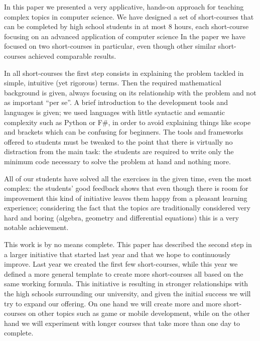 
In this paper we presented a very applicative, hands-on approach for teaching complex topics in computer science. We have designed a set of short-courses that can be completed by high school students in at most 8 hours, each short-course focusing on an advanced application of computer science In the paper we have focused on two short-courses in particular, even though other similar short-courses achieved comparable results.

In all short-courses the first step consists in explaining the problem tackled in simple, intuitive (yet rigorous) terms. Then the required mathematical background is given, always focusing on its relationship with the problem and not as important ``per se''. A brief introduction to the development tools and languages is given; we used languages with little syntactic and semantic complexity such as Python or F\#, in order to avoid explaining things like scope and brackets which can be confusing for beginners. The tools and frameworks offered to students must be tweaked to the point that there is virtually no distraction from the main task: the students are required to write only the minimum code necessary to solve the problem at hand and nothing more.

All of our students have solved all the exercises in the given time, even the most complex: the students' good feedback shows that even though there is room for improvement this kind of initiative leaves them happy from a pleasant learning experience; considering the fact that the topics are traditionally considered very hard and boring (algebra, geometry and differential equations) this is a very notable achievement.

This work is by no means complete. This paper has described the second step in a larger initiative that started last year and that we hope to continuously improve. Last year we created the first few short-courses, while this year we defined a more general template to create more short-courses all based on the same working formula. This initiative is resulting in stronger relationships with the high schools surrounding our university, and given the initial success we will try to expand our offering. On one hand we will create more and more short-courses on other topics such as game or mobile development, while on the other hand we will experiment with longer courses that take more than one day to complete.
